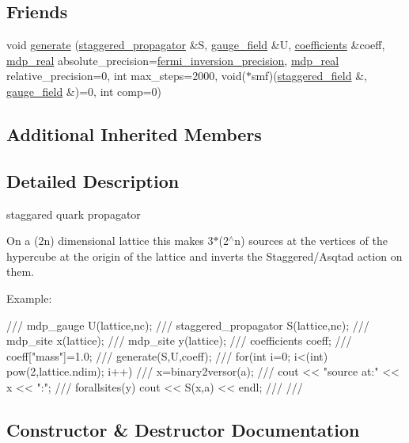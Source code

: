 \subsection*{Friends}
\begin{DoxyCompactItemize}
\item 
void \hyperlink{classstaggered__propagator_a7849b2db88d889afda04b4ee01476b64}{generate} (\hyperlink{classstaggered__propagator}{staggered\+\_\+propagator} \&S, \hyperlink{classgauge__field}{gauge\+\_\+field} \&U, \hyperlink{classcoefficients}{coefficients} \&coeff, \hyperlink{mdp__global__vars_8h_a69d96b74c791e0bbdb888b3913a69450}{mdp\+\_\+real} absolute\+\_\+precision=\hyperlink{fermiqcd__default__parameters_8h_ab11c95dc923c6bfd349bd67af277d59d}{fermi\+\_\+inversion\+\_\+precision}, \hyperlink{mdp__global__vars_8h_a69d96b74c791e0bbdb888b3913a69450}{mdp\+\_\+real} relative\+\_\+precision=0, int max\+\_\+steps=2000, void($\ast$smf)(\hyperlink{classstaggered__field}{staggered\+\_\+field} \&, \hyperlink{classgauge__field}{gauge\+\_\+field} \&)=0, int comp=0)
\end{DoxyCompactItemize}
\subsection*{Additional Inherited Members}


\subsection{Detailed Description}
staggared quark propagator 

On a (2n) dimensional lattice this makes 3$\ast$(2$^\wedge$n) sources at the vertices of the hypercube at the origin of the lattice and inverts the Staggered/\+Asqtad action on them.

Example\+: \begin{DoxyVerb}/// mdp_gauge U(lattice,nc);
/// staggered_propagator S(lattice,nc);
/// mdp_site x(lattice);
/// mdp_site y(lattice);
/// coefficients coeff;
/// coeff["mass"]=1.0;
/// generate(S,U,coeff);
/// for(int i=0; i<(int) pow(2,lattice.ndim); i++) {
///    x=binary2versor(a);
///    cout << "source at:" << x << "\nprop:\n"; 
///    forallsites(y) cout << S(x,a) << endl;
/// }
/// \end{DoxyVerb}
 

\subsection{Constructor \& Destructor Documentation}
\mbox{\label{classstaggered__propagator_ad2abd9534d09d4f0af54a53ed4e092c6}} 
